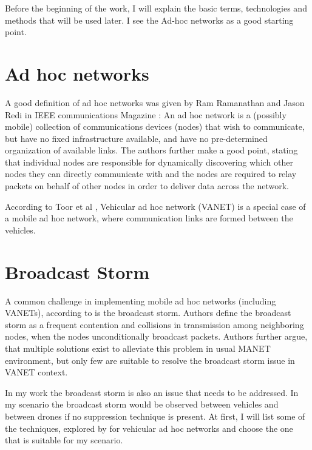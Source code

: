 \documentclass[]{nsm-thesis}
\begin{document}
Before the beginning of the work, I will explain the basic terms, technologies and methods that will be used later. I see the Ad-hoc networks as a good starting point.

\section{Ad hoc networks}

A good definition of ad hoc networks was given by Ram Ramanathan and Jason Redi in IEEE communications Magazine \cite{ramanathan2002brief}: An ad hoc network is a (possibly mobile) collection of communications devices (nodes) that wish to communicate, but have no fixed infrastructure available, and have no pre-determined organization of available links. The authors further make a good point, stating that individual nodes are responsible for dynamically discovering which other nodes they can directly communicate with and the nodes are required to relay packets on behalf of other nodes in order to deliver data across the network.

According to Toor et al \cite{toor2008}, Vehicular ad hoc network (\ac{VANET}) is a special case of a mobile ad hoc network, where communication links are formed between the vehicles.

\section{Broadcast Storm}

A common challenge in implementing mobile ad hoc networks (including \acp{VANET}), according to \textcite{wisitrophan2007} is the broadcast storm. Authors define the broadcast storm as a frequent contention and collisions in transmission among neighboring nodes, when the nodes unconditionally broadcast packets. Authors further argue, that multiple solutions exist to alleviate this problem in usual \ac{MANET} environment, but only few are suitable to resolve the broadcast storm issue in \ac{VANET} context.

In my work the broadcast storm is also an issue that needs to be addressed. In my scenario the broadcast storm would be observed between vehicles and between drones if no suppression technique is present. At first, I will list some of the techniques, explored by \textcite{wisitrophan2007} for vehicular ad hoc networks and choose the one that is suitable for my scenario.
\end{document}
